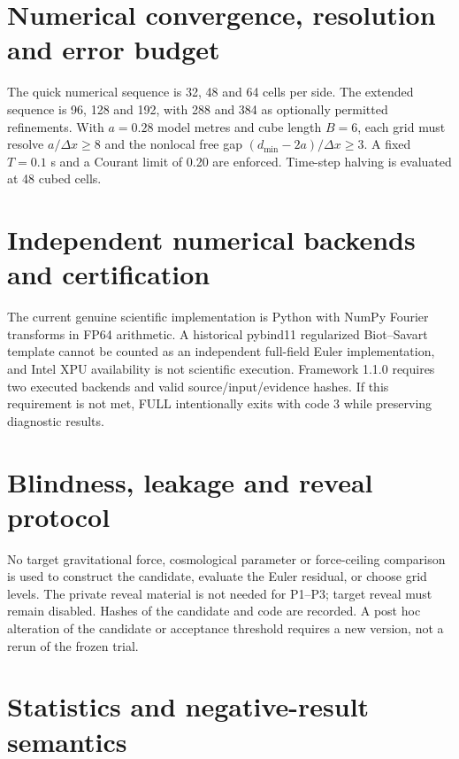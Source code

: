 \documentclass[11pt,a4paper]{article}
\begin{document}
\section{Numerical convergence, resolution and error budget}

The quick numerical sequence is 32, 48 and 64 cells per side. The extended sequence is 96, 128 and 192, with 288 and 384 as optionally permitted refinements. With $a=0.28$ model metres and cube length $B=6$, each grid must resolve $a/\Delta x\geq 8$ and the nonlocal free gap $(d_{\min}-2a)/\Delta x\geq3$. A fixed $T=0.1$ s and a Courant limit of 0.20 are enforced. Time-step halving is evaluated at 48 cubed cells.


\section{Independent numerical backends and certification}

The current genuine scientific implementation is Python with NumPy Fourier transforms in FP64 arithmetic. A historical pybind11 regularized Biot--Savart template cannot be counted as an independent full-field Euler implementation, and Intel XPU availability is not scientific execution. Framework 1.1.0 requires two executed backends and valid source/input/evidence hashes. If this requirement is not met, FULL intentionally exits with code 3 while preserving diagnostic results.


\section{Blindness, leakage and reveal protocol}

No target gravitational force, cosmological parameter or force-ceiling comparison is used to construct the candidate, evaluate the Euler residual, or choose grid levels. The private reveal material is not needed for P1--P3; target reveal must remain disabled. Hashes of the candidate and code are recorded. A post hoc alteration of the candidate or acceptance threshold requires a new version, not a rerun of the frozen trial.


\section{Statistics and negative-result semantics}
\end{document}
